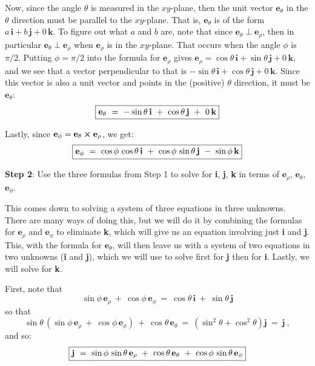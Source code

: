 Now, since the angle $\theta$ is measured in the $xy$-plane, then the unit vector $\textbf{e}_{\theta}$ in the $\theta$
direction must be parallel to the $xy$-plane. That is, $\textbf{e}_{\theta}$ is of the form $a\,\textbf{i} +
b\,\textbf{j} + 0\,\textbf{k}$. To figure out what $a$ and $b$ are, note that since $\textbf{e}_{\theta} \perp
\textbf{e}_{\rho}$, then in particular $\textbf{e}_{\theta} \perp \textbf{e}_{\rho}$ when $\textbf{e}_{\rho}$ is in the
$xy$-plane. That occurs when the angle $\phi$ is $\pi/2$. Putting $\phi = \pi/2$ into the formula for
$\textbf{e}_{\rho}$ gives $\textbf{e}_{\rho} = \cos\theta\,\textbf{i} + \sin\theta\,\textbf{j} + 0\,\textbf{k}$, and
we see that a vector perpendicular to that is $-\sin\theta\,\textbf{i} + \cos\theta\,\textbf{j} + 0\,\textbf{k}$. Since
this vector is also a unit vector and points in the (positive) $\theta$ direction, it must be $\textbf{e}_{\theta}$:
\begin{displaymath}
 \fbox{$\textbf{e}_{\theta} ~=~ -\sin\theta\,\textbf{i} ~+~ \cos\theta\,\textbf{j} ~+~ 0\,\textbf{k}$}
\end{displaymath}

Lastly, since $\textbf{e}_{\phi}=\textbf{e}_{\theta} \bm{\times} \textbf{e}_{\rho}$, we get:
\begin{displaymath}
 \fbox{$\textbf{e}_{\phi} ~=~ \cos\phi\,\cos\theta\,\textbf{i} ~+~ \cos\phi\,\sin\theta\,\textbf{j} ~-~ \sin\phi\,\textbf{k}$}
\end{displaymath}

\par\noindent\textbf{Step 2}: Use the three formulas from Step 1 to solve for \textbf{i}, \textbf{j}, \textbf{k} in
terms of $\textbf{e}_{\rho}$, $\textbf{e}_{\theta}$, $\textbf{e}_{\phi}$.

This comes down to solving a system of three equations in three unknowns. There are many ways of doing this, but we will
do it by combining the formulas for $\textbf{e}_{\rho}$ and $\textbf{e}_{\phi}$ to eliminate \textbf{k}, which will give
us an equation involving just \textbf{i} and \textbf{j}. This, with the formula for $\textbf{e}_{\theta}$, will then
leave us with a system of two equations in two unknowns (\textbf{i} and \textbf{j}), which we will use to solve
first for \textbf{j} then for \textbf{i}. Lastly, we will solve for \textbf{k}.

First, note that
\begin{displaymath}
 \sin\phi\,\textbf{e}_{\rho} ~+~ \cos\phi\,\textbf{e}_{\phi} ~=~ \cos\theta\,\textbf{i} ~+~ \sin\theta\,\textbf{j}
\end{displaymath}
\newpage
\noindent so that
\begin{displaymath}
 \sin\theta\,(\sin\phi\,\textbf{e}_{\rho} ~+~ \cos\phi\,\textbf{e}_{\phi}) ~+~ \cos\theta\,\textbf{e}_{\theta} ~=~
  (\sin^2 \theta + \cos^2 \theta)\textbf{j} ~=~ \textbf{j} ~,
\end{displaymath}
and so:
\begin{displaymath}
 \fbox{$\textbf{j} ~=~ \sin\phi\,\sin\theta\,\textbf{e}_{\rho} ~+~ \cos\theta\,\textbf{e}_{\theta} ~+~
  \cos\phi\,\sin\theta\,\textbf{e}_{\phi}$}
\end{displaymath}

